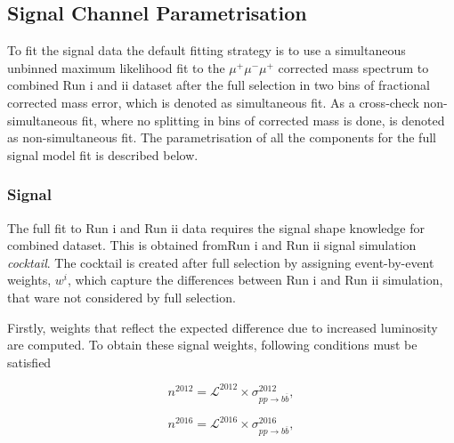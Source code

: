 \subsection{Signal Channel Parametrisation}
\label{sigpara}
To fit the signal data the default fitting strategy is to use a simultaneous unbinned maximum likelihood fit to the $\mu^{+} \mu^{-} \mu^{+}$ corrected mass spectrum to combined Run \Rn{1} and \Rn{2} dataset after the full selection in two bins of fractional corrected mass error, which is denoted as simultaneous fit. As a cross-check non-simultaneous fit, where no splitting in bins of corrected mass is done, is denoted as non-simultaneous fit. The parametrisation of all the components for the full signal model fit is described below.


\subsubsection{Signal}
The full fit to Run \Rn{1} and Run \Rn{2} data requires the signal shape knowledge for combined dataset. This is obtained fromRun \Rn{1} and Run \Rn{2} signal simulation \textit{cocktail}. The cocktail is created after full selection by assigning event-by-event weights, \textit{$w^{i}$}, which capture the differences between Run \Rn{1} and Run \Rn{2} simulation, that ware not considered by full selection.

Firstly, weights that reflect the expected difference due to increased luminosity are computed. To obtain these signal weights, following conditions must be satisfied

\begin{equation}
n^{2012}=\mathcal{L}^{2012} \times \sigma^{2012}_{pp \rightarrow b \overline{b}},
\end{equation}

\begin{equation}
n^{2016}=\mathcal{L}^{2016} \times \sigma^{2016}_{pp \rightarrow b \overline{b}},
\end{equation}

